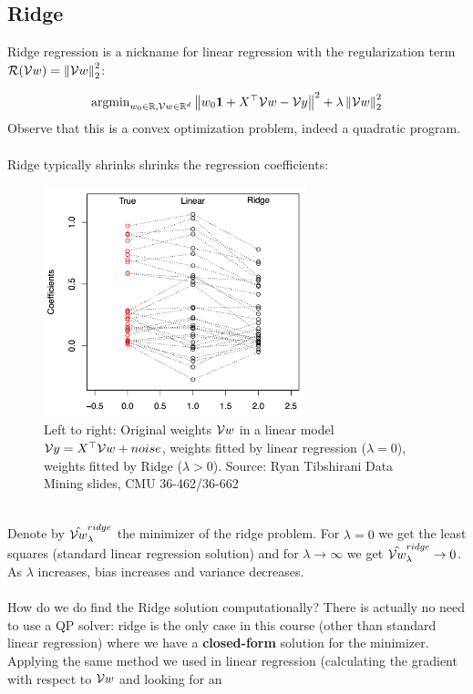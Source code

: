 \subsection{Ridge}

Ridge regression is a nickname for linear regression with the regularization term
$\mathcal{R}(\mathcal{V}{w})=\left\| \mathcal{V}{w}\right\|_2^2$:

\[
      \text{argmin}_{w_0\in\mathbb{R},\mathcal{V}{w}\in\mathbb{R}^{d}} \left\|  w_0\mathbf{1} + X^{\top}\mathcal{V}{w} -\mathcal{V}{y}  \right\|^2
+  \lambda \left\| \mathcal{V}{w}\right\|^2_2
    \]
    Observe that this is a convex optimization problem, indeed a quadratic
    program. 
\\~\\
Ridge typically shrinks shrinks the regression coefficients:
    \begin{figure}[h!]
      \centering
      \includegraphics[width=3in]{ridge_coefs.jpeg}
      \caption{Left to right:
        Original weights $\mathcal{V}{w}$ in a linear model $\mathcal{V}{y}=X^{\top}
        \mathcal{V}{w} + noise$, weights fitted by linear regression ($\lambda=0$),
      weights fitted by Ridge ($\lambda>0$). Source: Ryan Tibshirani Data Mining slides, CMU 36-462/36-662 }
    \end{figure}
~\\
Denote by $\hat{\mathcal{V}{w}}_\lambda^{ridge}$ the
minimizer of the ridge problem. For $\lambda=0$ we get the least squares
(standard linear regression solution) and  for $\lambda\to\infty$ we get 
$\hat{\mathcal{V}{w}}_\lambda^{ridge}\to0$. As $\lambda$ increases, bias  increases and
variance decreases. 
\\~\\
How do we do find the Ridge solution computationally?
There is actually no need to use a QP solver: ridge is the only case in this
course (other than standard linear regression) where we have a 
{\bf closed-form}
solution for the minimizer. Applying the same method we used in linear
regression (calculating the gradient with respect to $\mathcal{V}{w}$ and looking for an
